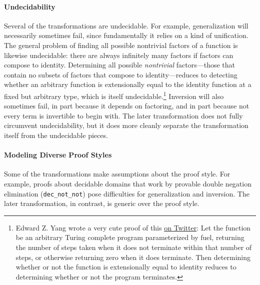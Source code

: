 \paragraph{Undecidability}
Several of the transformations are undecidable.
For example, generalization will necessarily sometimes fail, since fundamentally it relies on a kind of unification.
The general problem of finding all possible nontrivial factors of a function is likewise undecidable:
there are always infinitely many factors if factors can compose to identity.
Determining all possible \textit{nontrivial} factors---those that contain no subsets of factors
that compose to identity---reduces to detecting whether an arbitrary function is extensionally equal
to the identity function at a fixed but arbitrary type,
which is itself undecidable.\footnote{Edward Z. Yang wrote a very cute proof of this \href{https://twitter.com/ezyang/status/1391546552989241346}{on Twitter}: Let the function be an arbitrary Turing complete program parameterized by fuel, returning
the number of steps taken when it does not terminate within that number of steps, or otherwise returning zero when it does terminate.
Then determining whether or not the function is extensionally equal to identity reduces to determining whether or not
the program terminates.}
Inversion will also sometimes fail, in part because it depends on factoring,
and in part because not every term is invertible to begin with.
The later \toolnamec transformation does not fully circumvent undecidability,
but it does more cleanly separate the transformation itself from the undecidable pieces.

\paragraph{Modeling Diverse Proof Styles}
Some of the transformations make assumptions about the proof style.
For example, proofs about decidable domains that work by provable double negation elimination
(\lstinline{dec_not_not}) pose difficulties for generalization and inversion.
The later \toolnamec transformation, in contrast, is generic over the
proof style.

